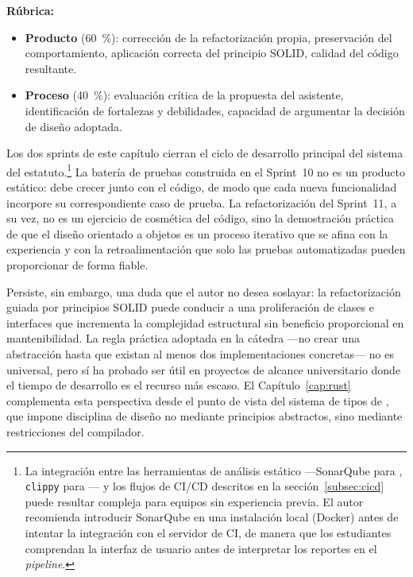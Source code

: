 \begin{tcolorbox}[actividadIA,
  title={Actividad de reflexión (Sprint~11) ---
         Software generativo y refactorización}]
\bigskip
\textbf{Rúbrica:}
\begin{itemize}
  \item \textbf{Producto} (60~\%): corrección de la refactorización propia, preservación
        del comportamiento, aplicación correcta del principio SOLID, calidad del código
        resultante.
  \item \textbf{Proceso} (40~\%): evaluación crítica de la propuesta del asistente,
        identificación de fortalezas y debilidades, capacidad de argumentar la decisión
        de diseño adoptada.
\end{itemize}

\end{tcolorbox}

\bigskip


\noindent
Los dos sprints de este capítulo cierran el ciclo de desarrollo principal del sistema
del estatuto.\footnote{La integración entre las herramientas de análisis estático
---SonarQube para \java, \texttt{clippy} para \rust--- y los flujos de CI/CD descritos
en la sección~\ref{subsec:cicd} puede resultar compleja para equipos sin experiencia
previa. El autor recomienda introducir SonarQube en una instalación local (Docker) antes
de intentar la integración con el servidor de CI, de manera que los estudiantes comprendan
la interfaz de usuario antes de interpretar los reportes en el \textit{pipeline}.} La batería
de pruebas construida en el Sprint~10 no es un producto estático: debe crecer junto con el
código, de modo que cada nueva funcionalidad incorpore su correspondiente caso de prueba.
La refactorización del Sprint~11, a su vez, no es un ejercicio de cosmética del código,
sino la demostración práctica de que el diseño orientado a objetos es un proceso iterativo
que se afina con la experiencia y con la retroalimentación que solo las pruebas automatizadas
pueden proporcionar de forma fiable.

Persiste, sin embargo, una duda que el autor no desea soslayar: la refactorización guiada
por principios SOLID puede conducir a una proliferación de clases e interfaces que incrementa
la complejidad estructural sin beneficio proporcional en mantenibilidad. La regla práctica
adoptada en la cátedra ---no crear una abstracción hasta que existan al menos dos implementaciones
concretas--- no es universal, pero sí ha probado ser útil en proyectos de alcance universitario
donde el tiempo de desarrollo es el recurso más escaso. El Capítulo~\ref{cap:rust} complementa
esta perspectiva desde el punto de vista del sistema de tipos de \rust, que impone disciplina
de diseño no mediante principios abstractos, sino mediante restricciones del compilador.
